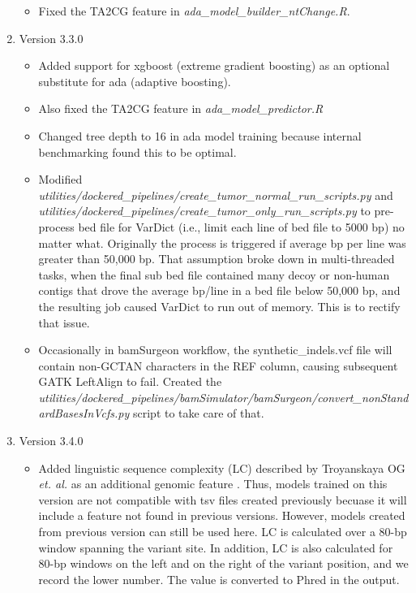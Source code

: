 \documentclass[10pt,letterpaper]{article}
\begin{document}
\begin{sloppypar}
\begin{enumerate}
		\begin{itemize}
		
			\item Fixed the TA2CG feature in \textit{ada\_model\_builder\_ntChange.R}.
		
		\end{itemize}


	\item Version 3.3.0
	
		\begin{itemize}

			\item Added support for xgboost (extreme gradient boosting) as an optional substitute for ada (adaptive boosting).
					
			\item Also fixed the TA2CG feature in \textit{ada\_model\_predictor.R}
			
			\item Changed tree depth to 16 in ada model training because internal benchmarking found this to be optimal.
			
			\item Modified \textit{utilities/dockered\_pipelines/create\_tumor\_normal\_run\_scripts.py} and \textit{utilities/dockered\_pipelines/create\_tumor\_only\_run\_scripts.py} to pre-process bed file for VarDict (i.e., limit each line of bed file to 5000 bp) no matter what. Originally the process is triggered if average bp per line was greater than 50,000 bp. That assumption broke down in multi-threaded tasks, when the final sub bed file contained many decoy or non-human contigs that drove the average bp/line in a bed file below 50,000 bp, and the resulting job caused VarDict to run out of memory. This is to rectify that issue.

            \item Occasionally in bamSurgeon workflow, the synthetic\_indels.vcf file will contain non-GCTAN characters in the REF column, causing subsequent GATK LeftAlign to fail. Created the \textit{utilities/dockered\_pipelines/bamSimulator/bamSurgeon/convert\_nonStandardBasesInVcfs.py} script to take care of that. 
		
		\end{itemize}

		
		
	\item Version 3.4.0
	
		\begin{itemize}
            \item Added linguistic sequence complexity (LC) described by Troyanskaya OG \textit{et. al.} as an additional genomic feature \cite{sequence_complexity}. Thus, models trained on this version are not compatible with tsv files created previously becuase it will include a feature not found in previous versions. However, models created from previous version can still be used here. LC is calculated over a 80-bp window spanning the variant site. In addition, LC is also calculated for 80-bp windows on the left and on the right of the variant position, and we record the lower number. The value is converted to Phred in the output. 


\end{itemize}
\end{enumerate}
\end{sloppypar}
\end{document}
